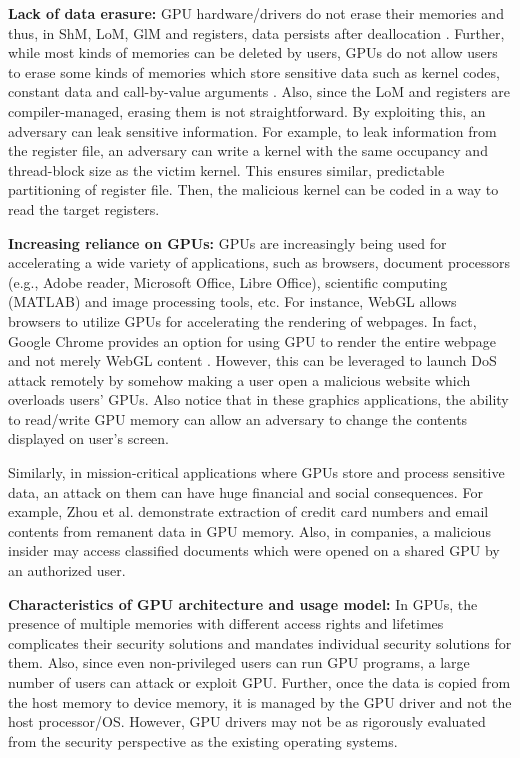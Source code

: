 \textbf{Lack of data erasure:} GPU hardware/drivers do not erase their memories and thus, in ShM, LoM, GlM and registers, data persists after deallocation \cite{pietro2016cuda,patterson2013vulnerability}.  
Further, while most kinds of memories can be deleted by users, GPUs do not allow users to erase some kinds of memories which store sensitive data such as kernel codes, constant data and call-by-value arguments \cite{lee2014stealing}. Also, since the LoM and registers are compiler-managed, erasing them is not straightforward.  By exploiting this, an adversary can leak sensitive information.  For example, to leak information from the register file, an adversary can write a kernel with the same occupancy and thread-block size as the victim kernel. This ensures similar, predictable partitioning of register file. Then, the malicious kernel can be coded in a way to read the target registers.

 
\textbf{Increasing reliance on GPUs:} GPUs are increasingly being used for accelerating a wide variety of applications, such as browsers, document processors (e.g., Adobe reader, Microsoft Office, Libre Office), scientific computing (MATLAB) and image processing tools, etc. For instance, WebGL allows browsers to utilize GPUs for accelerating the rendering of webpages. In fact, Google Chrome provides an option for using GPU to render the  entire webpage and not merely WebGL content \cite{chromeGPU}. However, this can be leveraged to launch DoS attack remotely by somehow making a user open a malicious website which overloads users' GPUs.  Also notice that in these graphics applications, the ability to read/write GPU memory can allow an adversary to change the contents displayed on user's screen. 

Similarly, in mission-critical applications where GPUs store and process sensitive data, an attack on them can have huge financial and social consequences. For example, Zhou et al. \cite{zhou2017vulnerable} demonstrate extraction of credit card numbers and email contents from remanent data in GPU memory. Also, in companies, a malicious insider may access classified documents  which were opened on a shared GPU by an authorized user.

\textbf{Characteristics of GPU architecture and usage model:} In GPUs, the presence of multiple memories with different access rights and lifetimes complicates their security solutions and mandates individual security solutions for them. Also, since even non-privileged users can run GPU programs, a large number of users can attack or exploit GPU. Further, once the data is copied from the host memory to device memory, it is managed by the GPU driver and not the host processor/OS. However, GPU drivers may not be as rigorously evaluated from the security perspective as the existing operating systems. 



